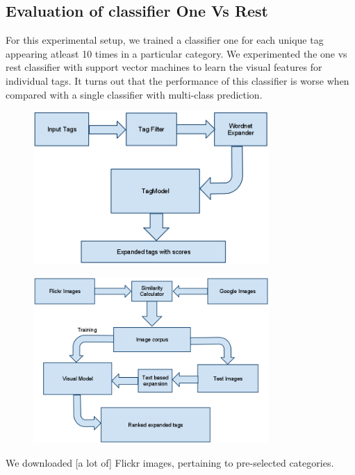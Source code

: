 \documentclass[12pt]{article}
\begin{document}
\subsection{Evaluation of classifier One Vs Rest}
For this experimental setup, we trained a classifier one for each unique tag appearing atleast
10 times in a particular category. We experimented the one vs rest classifier with support vector
machines to learn the visual features for individual tags. It turns out that the performance of
this classifier is worse when compared with a single classifier with multi-class prediction.


\begin{figure}[h]
\includegraphics[width=0.8\textwidth]{tagExpansion.png}
\end{figure}

\begin{figure}[h]
\includegraphics[width=0.8\textwidth]{model.png}
\end{figure}

We downloaded [a lot of] Flickr images, pertaining to pre-selected categories.
\end{document}
